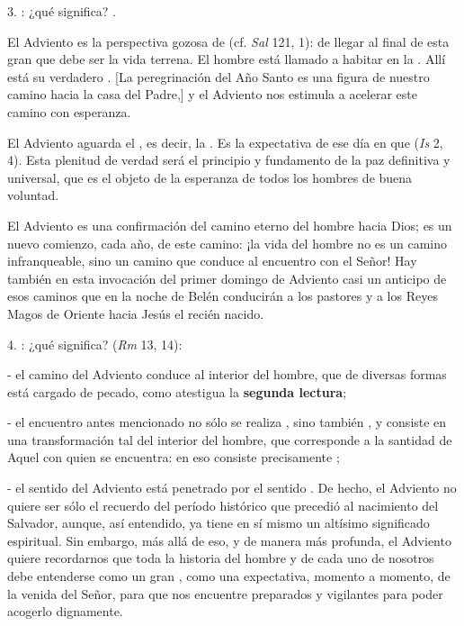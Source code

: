 \begin{body}
	3. : ¿qué significa? .

	El Adviento es la perspectiva gozosa de  (cf. \emph{Sal} 121, 1): de llegar al final de esta gran  que debe ser la vida terrena. El hombre está llamado a habitar en la . Allí está su verdadero . {[}La peregrinación del Año Santo es una figura de nuestro camino hacia la casa del Padre,{]} y el Adviento nos estimula a acelerar este camino con esperanza.

	El Adviento aguarda el , es decir, la . Es la expectativa de ese día en que  (\emph{Is} 2, 4). Esta plenitud de verdad será el principio y fundamento de la paz definitiva y universal, que es el objeto de la esperanza de todos los hombres de buena voluntad.

	El Adviento es una confirmación del camino eterno del hombre hacia Dios; es un nuevo comienzo, cada año, de este camino: ¡la vida del hombre no es un camino infranqueable, sino un camino que conduce al encuentro con el Señor! Hay también en esta invocación del primer domingo de Adviento casi un anticipo de esos caminos que en la noche de Belén conducirán a los pastores y a los Reyes Magos de Oriente hacia Jesús el recién nacido.

	4. : ¿qué significa?  (\emph{Rm} 13, 14):

	- el camino del Adviento conduce al interior del hombre, que de diversas formas está cargado de pecado, como atestigua la \textbf{segunda lectura};

	- el encuentro antes mencionado no sólo se realiza , sino también , y consiste en una transformación tal del interior del hombre, que corresponde a la santidad de Aquel con quien se encuentra: en eso consiste precisamente ;

	- el sentido  del Adviento está penetrado por el sentido . De hecho, el Adviento no quiere ser sólo el recuerdo del período histórico que precedió al nacimiento del Salvador, aunque, así entendido, ya tiene en sí mismo un altísimo significado espiritual. Sin embargo, más allá de eso, y de manera más profunda, el Adviento quiere recordarnos que toda la historia del hombre y de cada uno de nosotros debe entenderse como un gran , como una expectativa, momento a momento, de la venida del Señor, para que nos encuentre preparados y vigilantes para poder acogerlo dignamente.


\end{body}
